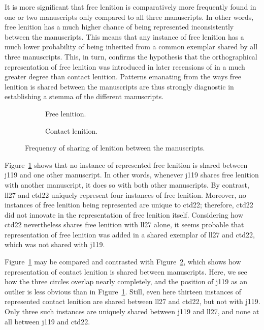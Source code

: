 It is more significant that free lenition is comparatively more frequently found in one or two manuscripts only compared to all three manuscripts. In other words, free lenition has a much higher chance of being represented inconsistently between the manuscripts. This means that any instance of free lenition has a much lower probability of being inherited from a common exemplar shared by all three manuscripts. This, in turn, confirms the hypothesis that the orthographical representation of free lenition was introduced in later recensions of  in a much greater degree than contact lenition. Patterns  emanating from the ways free lenition is shared between the manuscripts are thus strongly diagnostic in establishing a stemma of the different manuscripts.

\begin{figure}[h]
  \begin{subfigure}[b]{0.5\linewidth}
    \centering
    
    \caption{Free lenition.}
    \label{fig:vennfreelendewi}
  \end{subfigure}%
  \begin{subfigure}[b]{0.5\linewidth}
    \centering
    
    \caption{Contact lenition.}
    \label{fig:venncontlendewi}
  \end{subfigure}
  \caption{Frequency of sharing of lenition between  the manuscripts.}
  \label{fig:vennlendewi}
\end{figure}
Figure~\ref{fig:vennfreelendewi} shows that no instance of represented free lenition  is shared between \gls{j119} and one other manuscript. In other words, whenever \gls{j119} shares free lenition with another manuscript, it does so with both other manuscripts. By contrast, \gls{ll27} and \gls{ctd22} uniquely represent four instances of free lenition. Moreover, no instances of free lenition being represented are unique to \gls{ctd22}; therefore, \gls{ctd22} did not innovate in the representation of free lenition itself. Considering how \gls{ctd22} nevertheless shares free lenition with \gls{ll27} alone, it seems probable that representation of free lenition was added in a shared exemplar of \gls{ll27} and \gls{ctd22}, which was not shared with \gls{j119}.


Figure~\ref{fig:vennfreelendewi} may be compared and contrasted with Figure~\ref{fig:venncontlendewi}, which shows how representation of contact lenition is shared between manuscripts. Here, we see how the three circles overlap nearly completely, and the position of \gls{j119} as an outlier is less obvious than in Figure~\ref{fig:vennfreelendewi}. Still, even here  thirteen instances of represented contact lenition are shared between \gls{ll27} and \gls{ctd22}, but not with \gls{j119}. Only three such instances are uniquely  shared between \gls{j119} and \gls{ll27}, and none at all between \gls{j119} and \gls{ctd22}.

